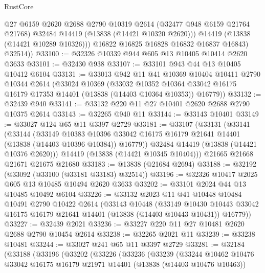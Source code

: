 \begin{lexlean}{RustCore}
\begin{coremodule}
              @27
              @6159
              @2620
              @2688
              @2790
              @10319
              @2614
              (@32477 @948 @6159 @21764 @21768)
              @32484
              @14419
              (@13838 (@14421 @10320 @2620)))
            @14419
            (@13838 (@14421 @10289 @10326)))
          @16822
          @16825
          @16828
          @16832
          @16837
          @16843)
        @32514))
@33100 := @32326 @10339 @944 @605 @13 @10405 @10414 @2620 @3633
@33101 := @32430 @938
@33107 := @33101 @943 @44 @13 @10405 @10412 @6104
@33131 := @33013
    @942
    @11
    @41
    @10369
    @10404
    @10411
    @2790
    @10344
    @2614
    (@33024
      @10369
      (@33032
        @10352
        @10364
        @33042
        @16175
        @16179
        @17353
        @14401
        (@13838 (@14403 @10364 @10353))
        @16779))
@33132 := @32439 @940
@33141 := @33132 @220 @11 @27 @10401 @2620 @2688 @2790 @10375 @2614
@33143 := @32265 @940 @11
@33144 := @33143 @10401
@33149 := @33027 @124 @65 @11 @3397 @2729
@33181 := @33107
    (@33131
      (@33141
        (@33144
          (@33149
            @10383
            @10396
            @33042
            @16175
            @16179
            @21641
            @14401
            (@13838 (@14403 @10396 @10384))
            @16779))
        @32484
        @14419
        (@13838 (@14421 @10376 @2620)))
      @14419
      (@13838 (@14421 @10345 @10404)))
    @21665
    @21668
    @21671
    @21675
    @21680
@33183 := @13838 (@21684 @2694)
@33188 := @32192 (@33092 (@33100 (@33181 @33183) @32514))
@33196 := @32326 @10417 @2025 @605 @13 @10485 @10494 @2620 @3633
@33202 := @33101 @2024 @44 @13 @10485 @10492 @6104
@33226 := @33132
    @2023
    @11
    @41
    @10448
    @10484
    @10491
    @2790
    @10422
    @2614
    (@33143
      @10448
      (@33149
        @10430
        @10443
        @33042
        @16175
        @16179
        @21641
        @14401
        (@13838 (@14403 @10443 @10431))
        @16779))
@33227 := @32439 @2021
@33236 := @33227 @220 @11 @27 @10481 @2620 @2688 @2790 @10454 @2614
@33238 := @32265 @2021 @11
@33239 := @33238 @10481
@33244 := @33027 @241 @65 @11 @3397 @2729
@33281 := @32184
    (@33188
      (@33196
        (@33202
          (@33226
            (@33236
              (@33239
                (@33244
                  @10462
                  @10476
                  @33042
                  @16175
                  @16179
                  @21971
                  @14401
                  (@13838 (@14403 @10476 @10463))

\end{coremodule}
\end{lexlean}
